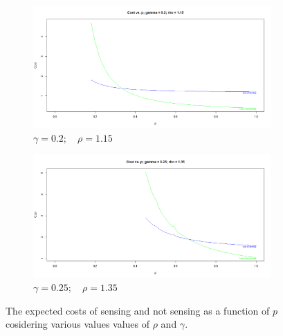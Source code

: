 \documentclass[11pt]{article}
\numberwithin{equation}{section}
\begin{document}
\begin{figure}[h!]
	\begin{subfigure}[b]{0.49\textwidth}
	\includegraphics[width=\textwidth]{cost_vs_p_02_115}
		\caption{$\gamma=0.2;\quad\rho=1.15$}
		\label{cost_vs_p_02_115}
	\end{subfigure}
	\begin{subfigure}[b]{0.49\textwidth}
	\includegraphics[width=\textwidth]{cost_vs_p_025_135}
		\caption{$\gamma=0.25;\quad\rho=1.35$}
		\label{cost_vs_p_025_135}
	\end{subfigure}
	\caption{The expected costs of sensing and not sensing as a function of $p$ cosidering various values values of $\rho$ and $\gamma$.}\label{CostVsP}
\end{figure}

\newpage
\begin{thebibliography}{99}

%
%
%
%
%

\end{thebibliography}
\end{document}
